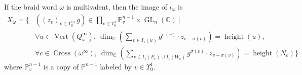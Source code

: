 \begin{theorem}\label{quoted3}
	If the braid word $\omega$ is multivalent, then the image of $\iota_{\omega}$ is 
\begin{align*}
X_\omega = \{&((z_v)_{v\in \Upsilon_0^1},g) \in \prod_{v\in \Upsilon_0^1} \mathbb{P}_v^{n-1}\times \operatorname{GL}_n(\mathbb{C})~| \\
& \forall u\in \operatorname{Vert}(Q_\omega^\infty),~\operatorname{dim}_\mathbb{C}(\sum_{v\in I_1(u)}g^{\sigma(v)}\cdot z_{v-\sigma(v)}) = \operatorname{height}(u),\\
& \forall c\in \operatorname{Cross}(\omega^\infty),~ \operatorname{dim}_\mathbb{C}(\sum_{v\in I_1(E_c)\cup I_1(W_c)}g^{\sigma(v)}\cdot z_{v-\sigma(v)}) = \operatorname{height}(N_c)\}
\end{align*}
where $\mathbb{P}^{n-1}_v$ is a copy of $\mathbb{P}^{n-1}$ labeled by $v\in \Upsilon_0^1$.
\end{theorem}
